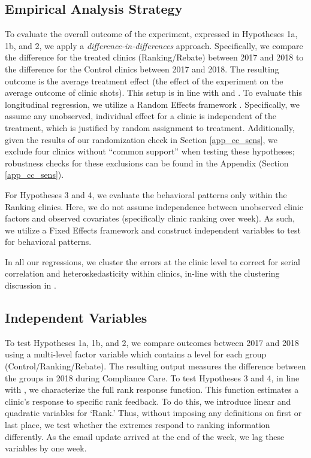  \subsection{Empirical Analysis Strategy} \label{emp_strat}
 To evaluate the overall outcome of the experiment, expressed in Hypotheses 1a, 1b, and 2, we apply a \textit{difference-in-differences} approach. Specifically, we compare the difference for the treated clinics (Ranking/Rebate) between 2017 and 2018 to the difference for the Control clinics between 2017 and 2018. The resulting outcome is the average treatment effect (the effect of the experiment on the average outcome of clinic shots). This setup is in line with \cite{Bertrand2004} and \cite{Wing2018}. To evaluate this longitudinal regression, we utilize a Random Effects framework \citep[as defined in][]{Wooldridge2010}. Specifically, we assume any unobserved, individual effect for a clinic is independent of the treatment, which is justified by random assignment to treatment. Additionally, given the results of our randomization check in Section \ref{app_cc_sens}, we exclude four clinics without “common support” when testing these hypotheses; robustness checks for these exclusions can be found in the Appendix (Section \ref{app_cc_sens}).
 
 For Hypotheses 3 and 4, we evaluate the behavioral patterns only within the Ranking clinics. Here, we do not assume independence between unobserved clinic factors and observed covariates (specifically clinic ranking over week). As such, we utilize a Fixed Effects framework \citep[][]{Wooldridge2010} and construct independent variables to test for behavioral patterns.
 
 In all our regressions, we cluster the errors at the clinic level to correct for serial correlation and heteroskedasticity within clinics, in-line with the clustering discussion in \cite{Bertrand2004}. 
 
 \subsection{Independent Variables}
 To test Hypotheses 1a, 1b, and 2, we compare outcomes between 2017 and 2018 using a multi-level factor variable which contains a level for each group (Control/Ranking/Rebate). The resulting output measures the difference between the groups in 2018 during Compliance Care. To test Hypotheses 3 and 4, in line with \cite{Gill2019}, we characterize the full rank response function. This function estimates a clinic’s response to specific rank feedback. To do this, we introduce linear and quadratic variables for ‘Rank.’ Thus, without imposing any definitions on first or last place, we test whether the extremes respond to ranking information differently. As the email update arrived at the end of the week, we lag these variables by one week.
 
